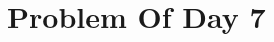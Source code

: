 \documentclass{article}
\newcommand{\YearPath}{../../../LatexConfig} %
\newcommand{\SemesterPath}{../../LatexConfig} %
\newcommand{\ClassPath}{../LatexConfig} %
\begin{document}




\section{Problem Of Day 7}

\end{document}
